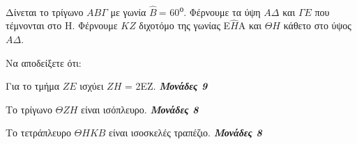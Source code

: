 \documentclass[11pt,a4paper,twoside]{book}
\newcommand{\monades}[1]{
\hspace*{\fill}
\textbf{\textit{\textcolor{maincolor}{Μονάδες #1}}}}
\begin{document}
Δίνεται το τρίγωνο $AB\varGamma $ με γωνία $\hat{B}\ $= 60\textsuperscript{ο}. Φέρνουμε τα ύψη $A\varDelta  $ και $\varGamma E$ που τέμνονται στο Η. Φέρνουμε $KZ$ διχοτόμο της γωνίας Ε$\hat{H}$Α και $\varTheta  H$ κάθετο στο ύψος $A\varDelta$.

Να αποδείξετε ότι:

\begin{alist}
\item Για το τμήμα $ZE$ ισχύει $ZH$ = 2ΕΖ. \monades{9}

\item Το τρίγωνο $\varTheta ZH$ είναι ισόπλευρο. \monades{8}

\item Το τετράπλευρο $\varTheta HKB$ είναι ισοσκελές τραπέζιο. \monades{8}

\begin{center}
\begin{tikzpicture}[scale=1.2]
%
%
%
%
%
%
\end{tikzpicture}
\end{center}
\end{alist}

\vspace{4mm}
\end{document}
